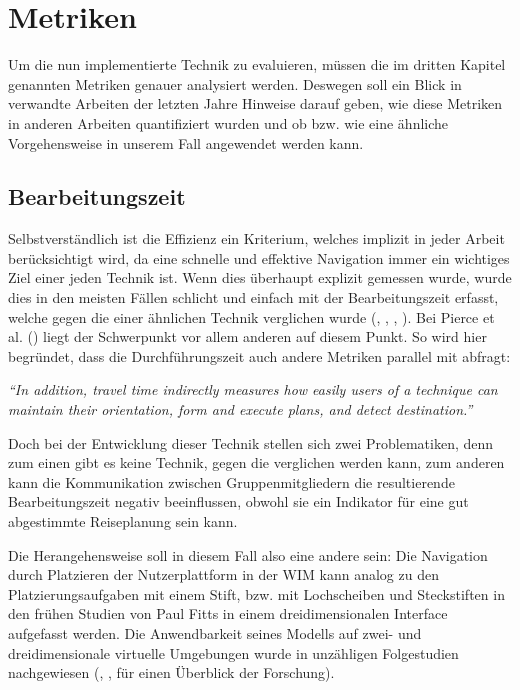 \section{Metriken}
Um die nun implementierte Technik zu evaluieren, müssen die im dritten Kapitel genannten Metriken genauer analysiert werden. Deswegen soll ein Blick in verwandte Arbeiten der letzten Jahre Hinweise darauf geben, wie diese Metriken in anderen Arbeiten quantifiziert wurden und ob bzw. wie eine ähnliche Vorgehensweise in unserem Fall angewendet werden kann.

\subsection{Bearbeitungszeit}
Selbstverständlich ist die Effizienz ein Kriterium, welches implizit in jeder Arbeit berücksichtigt wird, da eine schnelle und effektive Navigation immer ein wichtiges Ziel einer jeden Technik ist. Wenn dies überhaupt explizit gemessen wurde, wurde dies in den meisten Fällen schlicht und einfach mit der Bearbeitungszeit erfasst, welche gegen die einer ähnlichen Technik verglichen wurde (\cite{Suma2010EvaluationEnvironments}, \cite{Kopper2006DesignEnvironments}, \cite{3_Pierce1997}, \cite{Wingrave2006OvercomingWIM}). 
Bei Pierce et al. (\cite{3_Pierce1997}) liegt der Schwerpunkt vor allem anderen auf diesem Punkt. So wird hier begründet, dass die Durchführungszeit auch andere Metriken parallel mit abfragt:

\begin{addmargin}[25pt]{0pt} 

\textit{“In addition, travel time indirectly measures how easily users of a technique can maintain their orientation, form and execute plans, and detect destination.”}\cite{3_Pierce1997}

\end{addmargin}

Doch bei der Entwicklung dieser Technik stellen sich zwei Problematiken, denn zum einen gibt es keine Technik, gegen die verglichen werden kann, zum anderen kann die Kommunikation zwischen Gruppenmitgliedern die resultierende Bearbeitungszeit negativ beeinflussen, obwohl sie ein Indikator für eine gut abgestimmte Reiseplanung sein kann.

Die Herangehensweise soll in diesem Fall also eine andere sein:
Die Navigation durch Platzieren der Nutzerplattform in der WIM kann analog zu den Platzierungsaufgaben mit einem Stift, bzw. mit Lochscheiben und Steckstiften in den frühen Studien von Paul Fitts \cite{fitts1954information} in einem dreidimensionalen Interface aufgefasst werden. Die Anwendbarkeit seines Modells auf zwei- und dreidimensionale virtuelle Umgebungen wurde in unzähligen Folgestudien nachgewiesen (\cite{mackenzie1992fitts}, \cite{drewes2010only}, \cite{zhai2004characterizing} für einen Überblick der Forschung).

